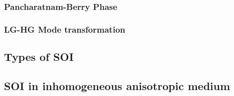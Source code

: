 \documentclass[11pt,a4paper]{article}
\numberwithin{equation}{section}
\begin{document}
\subsubsection{Pancharatnam-Berry Phase}

\subsubsection{LG-HG Mode transformation}

\subsection{Types of SOI}

\subsection{SOI in inhomogeneous anisotropic medium}
\end{document}
